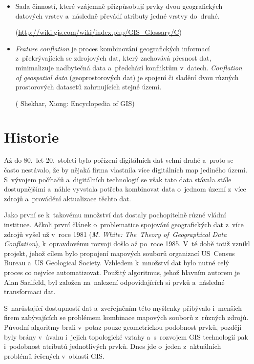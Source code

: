 \begin{itemize}
  \item Sada činností, které vzájemně přizpůsobují prvky dvou geografických
    datových vrstev a~následně převádí atributy jedné vrstvy do~druhé. %
    
    (\url{http://wiki.gis.com/wiki/index.php/GIS\_Glossary/C})
  
  \item \textit{Feature conflation} je proces kombinování geografických 
    informací z~překrývajících se zdrojových dat, který zachovává přesnost 
    dat, minimalizuje nadbytečná data a~předchází konfliktům v~datech. %
    \textit{Conflation of geospatial data} (geoprostorových dat) je spojení
    či sladění dvou různých prostorových datasetů zahrnujících stejné území.
    
     (\cite{gisencyclopedia} Shekhar, Xiong: Encyclopedia of GIS)

\end{itemize}

\section{Historie} %
\label{historie}

Až do 80.~let 20.~století bylo pořízení digitálních dat velmi drahé a~proto 
se často nestávalo, že by nějaká firma vlastnila více digitálních map jediného 
území. S~vývojem počítačů a~digitálních technologií se však tato data stávala 
stále dostupnějšími a~náhle vyvstala potřeba kombinovat data o~jednom území 
z~více zdrojů a~provádění aktualizace těchto dat. 

Jako první se k~takovému množství dat dostaly pochopitelně různé vládní 
instituce. Ačkoli první článek o~problematice spojování geografických dat 
z~více zdrojů vyšel už v~roce 1981 (\textit{M. White: The~Theory of~Geographical
Data Conflation}), k~opravdovému rozvoji došlo až po~roce 1985. V~té době 
totiž vznikl projekt, jehož cílem bylo propojení mapových souborů organizací
US~Census Bureau a~US Geological Society. Vzhledem k~množství dat bylo nutné
celý proces co nejvíce automatizovat. Použitý algoritmus, jehož hlavním autorem
je Alan Saalfeld, byl založen na~nalezení odpovídajících si prvků a~následné 
transformaci dat. 

S~narůstající dostupností dat a~zveřejněním této myšlenky přibývalo i~menších 
firem zabývajících se problémem kombinace mapových souborů z~různých zdrojů. 
Původní algoritmy brali v~potaz pouze geometrickou podobnost prvků, později 
byly brány v~úvahu i~jejich topologické vztahy a~s~rozvojem GIS technologií 
pak i~podobnost atributů jednotlivých prvků. Dnes jde o~jeden z~aktuálních 
problémů řešených v~oblasti GIS.



